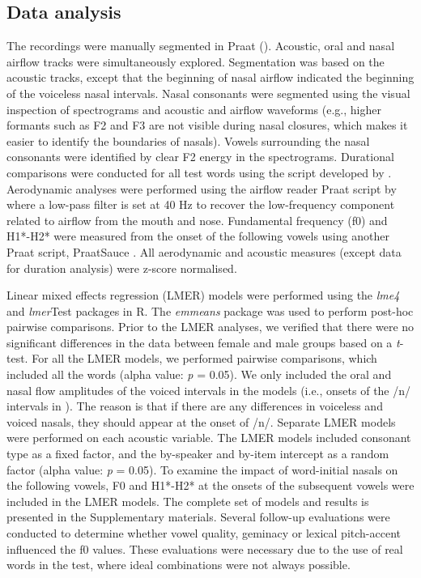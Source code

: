 \documentclass[output=paper]{langscibook}
\begin{document}
\subsection{Data analysis}
\label{sec:shinohara:3.4}
The recordings were manually segmented in Praat (\citealt{BoersmaWeenink2022}). Acoustic, oral and nasal airflow tracks were simultaneously explored. Segmentation was based on the acoustic tracks, except that the beginning of nasal airflow indicated the beginning of the voiceless nasal intervals. Nasal consonants were segmented using the visual inspection of spectrograms and acoustic and airflow waveforms (e.g., higher formants such as F2 and F3 are not visible during nasal closures, which makes it easier to identify the boundaries of nasals). Vowels surrounding the nasal consonants were identified by clear F2 energy in the spectrograms. Durational comparisons were conducted for all test words using the script developed by \citet{Kawahara2010}. Aerodynamic analyses were performed using the airflow reader Praat script by \citet{Styler2011} where a low-pass filter is set at 40 Hz to recover the low-frequency component related to airflow from the mouth and nose. Fundamental frequency (f0) and H1*-H2* were measured from the onset of the following vowels using another Praat script, PraatSauce \citep{Kirby2018}. All aerodynamic and acoustic measures (except data for duration analysis) were z-score normalised.

Linear mixed effects regression (LMER) models were performed using the \textit{lme4} \citep{BatesEtAl2015} and \textit{lmer}Test \citep{KuznetsovaEtAl2017} packages in R. The \textit{emmeans} package \citep{Lenth2016} was used to perform post-hoc pairwise comparisons. Prior to the LMER analyses, we verified that there were no significant differences in the data between female and male groups based on a \textit{t}-test. For all the LMER models, we performed pairwise comparisons, which included all the words (alpha value: \textit{p} = 0.05). We only included the oral and nasal flow amplitudes of the voiced intervals in the models (i.e., onsets of the /n/ intervals in ). The reason is that if there are any differences in voiceless and voiced nasals, they should appear at the onset of /n/. Separate LMER models were performed on each acoustic variable. The LMER models included consonant type as a fixed factor, and the by-speaker and by-item intercept as a random factor (alpha value: \textit{p} = 0.05). To examine the impact of word-initial nasals on the following vowels, F0 and H1*-H2* at the onsets of the subsequent vowels were included in the LMER models. The complete set of models and results is presented in the Supplementary materials. Several follow-up evaluations were conducted to determine whether vowel quality, geminacy or lexical pitch-accent influenced the f0 values. These evaluations were necessary due to the use of real words in the test, where ideal combinations were not always possible.
\end{document}
